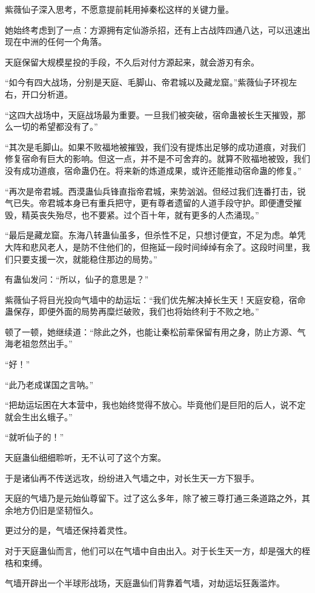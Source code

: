 \begin{this_body}
紫薇仙子深入思考，不愿意提前耗用掉秦松这样的关键力量。

她始终考虑到了一点：方源拥有定仙游杀招，还有上古战阵四通八达，可以迅速出现在中洲的任何一个角落。

天庭保留大规模星投的手段，不久后对付方源起来，就会游刃有余。

“如今有四大战场，分别是天庭、毛脚山、帝君城以及藏龙窟。”紫薇仙子环视左右，开口分析道。

“这四大战场中，天庭战场最为重要。一旦我们被突破，宿命蛊被长生天摧毁，那么一切的希望都没有了。”

“其次是毛脚山。如果不败福地被摧毁，我们没有提炼出足够的成功道痕，对我们修复宿命有巨大的影响。但这一点，并不是不可舍弃的。就算不败福地被毁，我们没有成功道痕，宿命蛊仍在。将来新的炼道成果，或许还能推动宿命蛊的修复。”

“再次是帝君城。西漠蛊仙兵锋直指帝君城，来势汹汹。但经过我们连番打击，锐气已失。帝君城本身已有重兵把守，更有尊者遗留的人道手段守护。即便遭受摧毁，精英丧失殆尽，也不要紧。过个百十年，就有更多的人杰涌现。”

“最后是藏龙窟。东海八转蛊仙虽多，但杀性不足，只想讨便宜，不足为虑。单凭大阵和悲风老人，是防不住他们的，但拖延一段时间绰绰有余了。这段时间里，我们只要支援一次，就能稳住那边的局势。”

有蛊仙发问：“所以，仙子的意思是？”

紫薇仙子将目光投向气墙中的劫运坛：“我们优先解决掉长生天！天庭安稳，宿命蛊保存，即便外面的局势再糜烂破败，我们也将始终利于不败之地。”

顿了一顿，她继续道：“除此之外，也能让秦松前辈保留有用之身，防止方源、气海老祖忽然出手。”

“好！”

“此乃老成谋国之言呐。”

“把劫运坛困在大本营中，我也始终觉得不放心。毕竟他们是巨阳的后人，说不定就会生出幺蛾子。”

“就听仙子的！”

天庭蛊仙细细聆听，无不认可了这个方案。

于是诸仙再不传送远攻，纷纷进入气墙之中，对长生天一方下狠手。

天庭的气墙乃是元始仙尊留下。过了这么多年，除了被三尊打通三条道路之外，其余地方仍旧是坚韧恒久。

更过分的是，气墙还保持着灵性。

对于天庭蛊仙而言，他们可以在气墙中自由出入。对于长生天一方，却是强大的桎梏和束缚。

气墙开辟出一个半球形战场，天庭蛊仙们背靠着气墙，对劫运坛狂轰滥炸。


\end{this_body}
